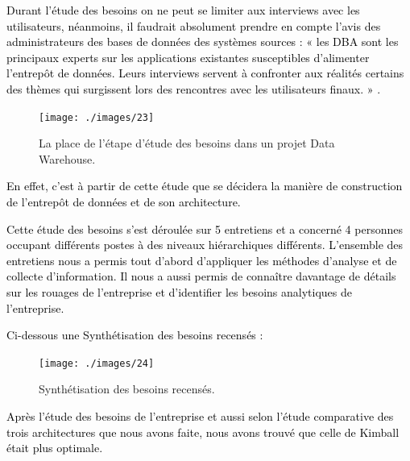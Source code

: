 \documentclass[a4paper,12pt]{report}
\begin{document}
\textcolor{black}{Durant l’étude des besoins on ne peut se limiter aux interviews avec les utilisateurs, néanmoins, il faudrait absolument prendre en compte l’avis des administrateurs des bases de données des systèmes sources : « les DBA sont les principaux experts sur les applications existantes susceptibles d'alimenter l'entrepôt de données. Leurs interviews servent à confronter aux réalités certains des thèmes qui surgissent lors des rencontres avec les utilisateurs finaux. » \citep{kimball1996data}.}

\begin{figure}[H]

\begin{center}
\texttt{[image: ./images/23]}
\end{center}

\caption{La place de l’étape d’étude des besoins dans un projet Data Warehouse.}
\label{fig:1}

\end{figure}

\textcolor{black}{En effet, c'est à partir de cette étude que se décidera la manière de construction de l’entrepôt de données et de son architecture. }

\textcolor{black}{Cette étude des besoins s’est déroulée sur 5 entretiens et a concerné 4 personnes occupant différents postes à des niveaux hiérarchiques différents. L’ensemble des entretiens nous a permis tout d’abord d’appliquer les méthodes d’analyse et de collecte d’information. Il nous a aussi permis de connaître davantage de détails sur les rouages de l’entreprise et d’identifier les besoins analytiques de l’entreprise.}

\textcolor{black}{Ci-dessous une Synthétisation des besoins recensés : }


\begin{figure}[H]

\begin{center}
\texttt{[image: ./images/24]}
\end{center}

\caption{Synthétisation des besoins recensés.}
\label{fig:1}

\end{figure}

\textcolor{black}{Après l’étude des besoins de l’entreprise et aussi selon l’étude comparative des trois architectures que nous avons faite, nous avons trouvé que celle de Kimball était plus optimale.}

~\
\end{document}

